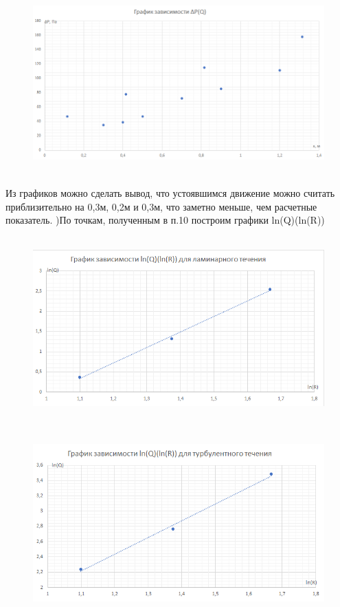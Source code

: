 \documentclass[12pt,a4paper]{article}
\begin{document}
\begin{figure}[H]
\centering
\includegraphics[width=14cm, height=7cm]{1.3.3_gr_6}
\end{figure}
\par Из графиков можно сделать вывод, что устоявшимся движение можно считать приблизительно на 0,3м, 0,2м и 0,3м, что заметно меньше, чем расчетные показатель. \hfill {})По точкам, полученным в п.10 построим графики ln(Q)(ln(R))
\begin{figure}[H]
\centering
\includegraphics[width=14cm, height=7cm]{1.3.3_gr_7}
\end{figure}
\begin{figure}[H]
\centering
\includegraphics[width=14cm, height=7cm]{1.3.3_gr_8}
\end{figure}
\end{document}
